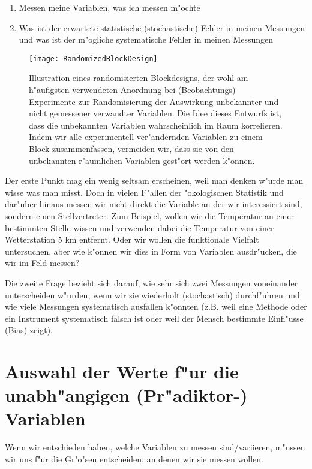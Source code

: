 \documentclass[a4paper,twoside]{tufte-book}\usepackage[]{graphicx}\usepackage[]{color}
\begin{document}
\begin{enumerate}
  \item Messen meine Variablen, was ich messen m"ochte
  \item Was ist der erwartete statistische (stochastische) Fehler in meinen Messungen und was ist der m"ogliche systematische Fehler in meinen Messungen
\end{enumerate}

\begin{figure}[]
\begin{center}
\texttt{[image: RandomizedBlockDesign]}
\caption{Illustration eines randomisierten Blockdesigns, der wohl am h"aufigsten verwendeten Anordnung bei (Beobachtungs)-Experimente zur Randomisierung der Auswirkung unbekannter und nicht gemessener verwandter Variablen. Die Idee dieses Entwurfs ist, dass die unbekannten Variablen wahrscheinlich im Raum korrelieren. Indem wir alle experimentell ver"andernden Variablen zu einem Block zusammenfassen, vermeiden wir, dass sie von den unbekannten r"aumlichen Variablen gest"ort werden k"onnen.}
\label{fig: RandomizedBlockDesign}
\end{center}
\end{figure}


Der erste Punkt mag ein wenig seltsam erscheinen, weil man denken w"urde man wisse was man misst. Doch in vielen F"allen der "okologischen Statistik und dar"uber hinaus messen wir nicht direkt die Variable an der wir interessiert sind, sondern einen Stellvertreter. Zum Beispiel, wollen wir die Temperatur an einer bestimmten Stelle wissen und verwenden dabei die Temperatur von einer Wetterstation 5 km entfernt. Oder wir wollen die funktionale Vielfalt untersuchen, aber wie k"onnen wir dies in Form von Variablen ausdr"ucken, die wir im Feld messen?

Die zweite Frage bezieht sich darauf, wie sehr sich zwei Messungen voneinander unterscheiden w"urden, wenn wir sie wiederholt (stochastisch) durchf"uhren und wie viele Messungen systematisch ausfallen k"onnten (z.B. weil eine Methode oder ein Instrument systematisch falsch ist oder weil der Mensch bestimmte Einfl"usse (Bias) zeigt).


\section{Auswahl der Werte f"ur die unabh"angigen (Pr"adiktor-) Variablen}

Wenn wir entschieden haben, welche Variablen zu messen sind/variieren, m"ussen wir uns f"ur die Gr"o"sen entscheiden, an denen wir sie messen wollen.
\end{document}
